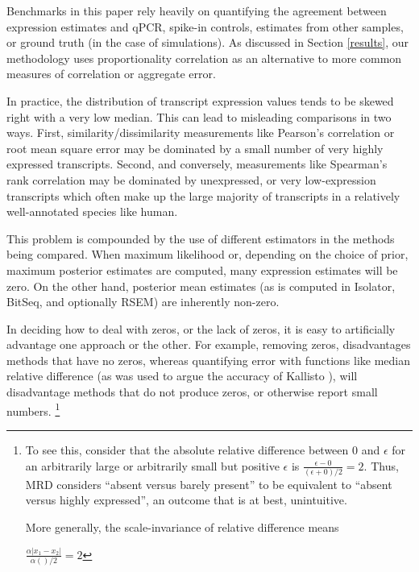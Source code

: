 \documentclass{article}
\begin{document}
Benchmarks in this paper rely heavily on quantifying the agreement between
expression estimates and qPCR, spike-in controls, estimates from other samples,
or ground truth (in the case of simulations). As discussed in Section
\ref{results}, our methodology uses proportionality correlation as an
alternative to more common measures of correlation or aggregate error.

In practice, the distribution of transcript expression values tends to be skewed
right with a very low median. This can lead to misleading comparisons in two
ways. First, similarity/dissimilarity measurements like Pearson's correlation or
root mean square error may be dominated by a small number of very highly
expressed transcripts. Second, and conversely, measurements like Spearman's rank
correlation may be dominated by unexpressed, or very low-expression transcripts
which often make up the large majority of transcripts in a relatively
well-annotated species like human.

This problem is compounded by the use of different estimators in the methods
being compared.  When maximum likelihood or, depending on the choice of prior,
maximum posterior estimates are computed, many expression estimates will be
zero. On the other hand, posterior mean estimates (as is computed in Isolator,
BitSeq, and optionally RSEM) are inherently non-zero.

In deciding how to deal with zeros, or the lack of zeros, it is easy to
artificially advantage one approach or the other. For example, removing zeros,
disadvantages methods that have no zeros, whereas quantifying error with
functions like median relative difference (as was used to argue the accuracy of
Kallisto \cite{Bray:2015uj}), will disadvantage methods that do not produce
zeros, or otherwise report small numbers.
\footnote{
To see this, consider that the absolute relative difference
between 0 and $\epsilon$ for an arbitrarily large or arbitrarily small but
positive $\epsilon$ is $\frac{\epsilon - 0}{(\epsilon + 0)/2} = 2$. Thus, MRD
considers ``absent versus barely present'' to be equivalent to ``absent versus
highly expressed'', an outcome that is at best, unintuitive.


More generally, the scale-invariance of relative difference means 






$\frac{\alpha |x_1 - x_2|}{\alpha()/2} = 2$

}
\end{document}
